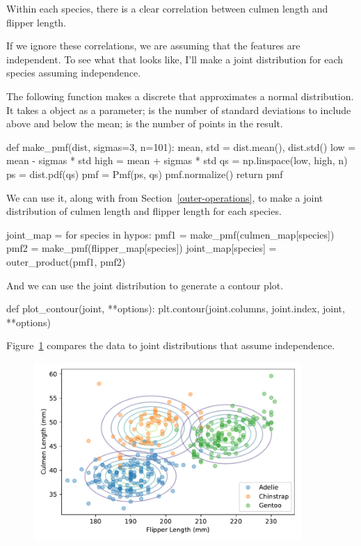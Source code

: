 \documentclass[12pt]{book}
\theoremstyle{exercise}
\begin{document}
Within each species, there is a clear correlation between culmen length
and flipper length.

If we ignore these correlations, we are assuming that the features are
independent. To see what that looks like, I'll make a joint distribution
for each species assuming independence.

The following function makes a discrete 
that approximates a normal distribution.
It takes a  object as a parameter;  is the number of standard deviations to include above and below the mean;  is the number of points in the result.

\begin{code}
def make_pmf(dist, sigmas=3, n=101):
    mean, std = dist.mean(), dist.std()
    low = mean - sigmas * std
    high = mean + sigmas * std
    qs = np.linspace(low, high, n)
    ps = dist.pdf(qs)
    pmf = Pmf(ps, qs)
    pmf.normalize()
    return pmf
\end{code}

We can use it, along with  from Section~\ref{outer-operations}, to make a joint distribution of culmen length and
flipper length for each species.

\begin{code}
joint_map = {}
for species in hypos:
    pmf1 = make_pmf(culmen_map[species])
    pmf2 = make_pmf(flipper_map[species])
    joint_map[species] = outer_product(pmf1, pmf2)
\end{code}

And we can use the joint distribution to generate a contour plot.

\begin{code}
def plot_contour(joint, **options):
    plt.contour(joint.columns, joint.index, joint, **options)
\end{code}

Figure~\ref{fig10-03} compares the data to joint distributions that
assume independence.

\begin{figure}
\centerline{\includegraphics[width=4in]{figs/fig10-03.pdf}}
\caption{}
\label{fig10-03}
\end{figure}
\end{document}
